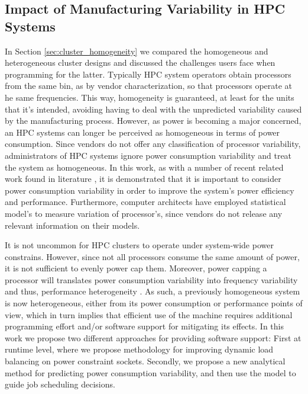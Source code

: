 \subsection{Impact of Manufacturing Variability in HPC Systems}
In Section \ref{sec:cluster_homogeneity} we compared the homogeneous and heterogeneous
cluster designs and discussed the challenges users face when programming for the latter.
Typically HPC system operators obtain processors from the same bin, as by vendor
characterization, so that processors operate at he same frequencies.  This way,
homogeneity is guaranteed, at least for the units that it's intended, avoiding having to
deal with the unpredicted variability caused by the manufacturing process.  However, as
power is becoming a major concerned, an HPC systems can longer be perceived as homogeneous
in terms of power consumption.  Since vendors do not offer any classification of processor
variability, administrators of HPC systems ignore power consumption variability and treat
the system as homogeneous.  In this work, as with a number of recent related work found in
literature
\cite{Teodorescu:2008:VAS:1381306.1382152,Inadomi:2015:AMI:2807591.2807638,Gholkar:2016:PTH:2967938.2967961,Ellsworth:2015:DPS:2807591.2807643,Bailey:2015:FLP:2807591.2807637,Totoni:tech:2014},
it is demonstrated that it is important to consider power consumption variability in order
to improve the system's power efficiency and performance.  Furthermore, computer
architects have employed statistical model's \cite{4041872,1510283,article,4447311}  to
measure variation of processor's, since vendors do not release any relevant information on
their models.

It is not uncommon for HPC clusters to operate under system-wide power constrains.
However, since not all processors consume the same amount of power, it is not sufficient
to evenly power cap them.  Moreover, power capping a processor will translates power
consumption variability into frequency variability and thus, performance heterogeneity
\cite{Rountree2012}.  As such, a previously homogeneous system is now heterogeneous,
either from its power consumption or performance points of view, which in turn implies
that efficient use of the machine requires additional programming effort and/or software
support for mitigating its effects.  In this work we propose two different approaches for
providing software support: First at runtime level, where we propose methodology for
improving dynamic load balancing on power constraint sockets.  Secondly, we propose a new
analytical method for predicting power consumption variability, and then use the model to
guide job scheduling decisions.




   

 
